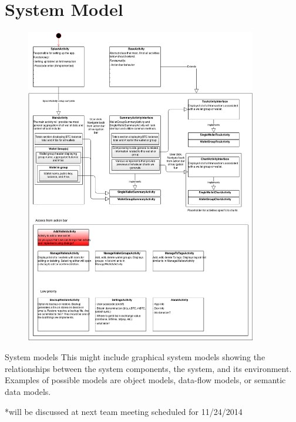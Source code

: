 \clearpage
\section{System Model}

\begin{figure}[H]
    \includegraphics[width=0.9\textwidth]{../diagrams/android_activities.png}
\end{figure}

System models This might include graphical system models showing the relationships between
the system components, the system, and its environment. Examples of possible
models are object models, data-flow models, or semantic data models.

*will be discussed at next team meeting scheduled for 11/24/2014
